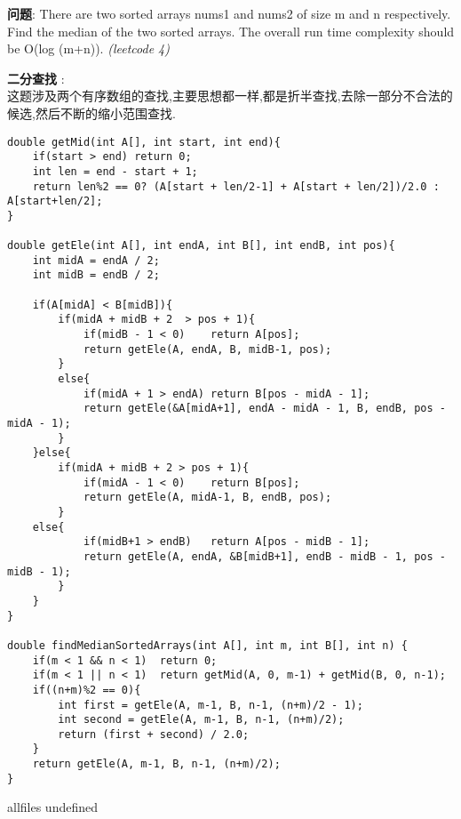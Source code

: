 \documentclass{article}
\begin{document}
\begin{CJK}{UTF8}{gbsn}     %

\else
    
\begin{description}
    \item{\textbf{问题}}: There are two sorted arrays nums1 and nums2 of size m and n respectively. Find the median of the two sorted arrays. The overall run time complexity should be O(log (m+n)). \textit{(leetcode 4)}
    \item{\textbf{二分查找}} : 
    \\这题涉及两个有序数组的查找,主要思想都一样,都是折半查找,去除一部分不合法的候选,然后不断的缩小范围查找.
    \begin{lstlisting}
double getMid(int A[], int start, int end){
	if(start > end) return 0;
	int len = end - start + 1;
	return len%2 == 0? (A[start + len/2-1] + A[start + len/2])/2.0 : A[start+len/2];
}

double getEle(int A[], int endA, int B[], int endB, int pos){
	int midA = endA / 2;
	int midB = endB / 2;

	if(A[midA] < B[midB]){
		if(midA + midB + 2  > pos + 1){
			if(midB - 1 < 0)	return A[pos];
			return getEle(A, endA, B, midB-1, pos);
		}
		else{
			if(midA + 1 > endA)	return B[pos - midA - 1];
			return getEle(&A[midA+1], endA - midA - 1, B, endB, pos - midA - 1);
		}
	}else{
		if(midA + midB + 2 > pos + 1){
			if(midA - 1 < 0)	return B[pos];
			return getEle(A, midA-1, B, endB, pos);
		}
	else{
			if(midB+1 > endB)	return A[pos - midB - 1];
			return getEle(A, endA, &B[midB+1], endB - midB - 1, pos - midB - 1);
		}
	}
}

double findMedianSortedArrays(int A[], int m, int B[], int n) {
	if(m < 1 && n < 1)	return 0;
	if(m < 1 || n < 1)	return getMid(A, 0, m-1) + getMid(B, 0, n-1);
	if((n+m)%2 == 0){
		int first =	getEle(A, m-1, B, n-1, (n+m)/2 - 1);
		int second = getEle(A, m-1, B, n-1, (n+m)/2);
		return (first + second) / 2.0;
	}
	return getEle(A, m-1, B, n-1, (n+m)/2);
}
    \end{lstlisting}
\end{description}

\fi

\ifx allfiles undefined
\end{CJK}
\end{document}
